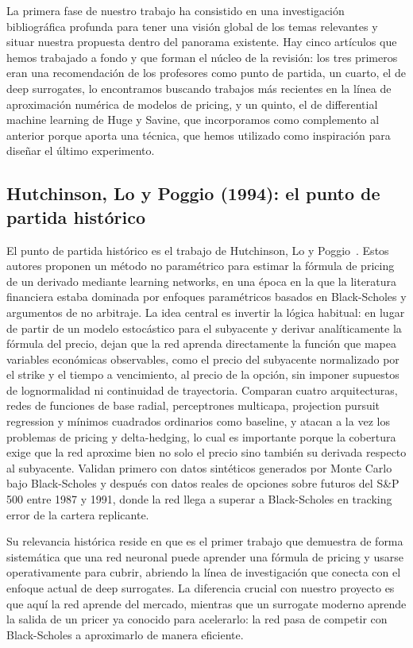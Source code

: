 \documentclass[11pt,a4paper]{article}
\begin{document}
La primera fase de nuestro trabajo ha consistido en una investigación bibliográfica profunda para tener una visión global de los temas relevantes y situar nuestra propuesta dentro del panorama existente. Hay cinco artículos que hemos trabajado a fondo y que forman el núcleo de la revisión: los tres primeros eran una recomendación de los profesores como punto de partida, un cuarto, el de deep surrogates, lo encontramos buscando trabajos más recientes en la línea de aproximación numérica de modelos de pricing, y un quinto, el de differential machine learning de Huge y Savine, que incorporamos como complemento al anterior porque aporta una técnica, que hemos utilizado como inspiración para diseñar el último experimento.

\subsection{Hutchinson, Lo y Poggio (1994): el punto de partida histórico}

El punto de partida histórico es el trabajo de Hutchinson, Lo y Poggio~\cite{hutchinson1994}. Estos autores proponen un método no paramétrico para estimar la fórmula de pricing de un derivado mediante learning networks, en una época en la que la literatura financiera estaba dominada por enfoques paramétricos basados en Black-Scholes y argumentos de no arbitraje. La idea central es invertir la lógica habitual: en lugar de partir de un modelo estocástico para el subyacente y derivar analíticamente la fórmula del precio, dejan que la red aprenda directamente la función que mapea variables económicas observables, como el precio del subyacente normalizado por el strike y el tiempo a vencimiento, al precio de la opción, sin imponer supuestos de lognormalidad ni continuidad de trayectoria. Comparan cuatro arquitecturas, redes de funciones de base radial, perceptrones multicapa, projection pursuit regression y mínimos cuadrados ordinarios como baseline, y atacan a la vez los problemas de pricing y delta-hedging, lo cual es importante porque la cobertura exige que la red aproxime bien no solo el precio sino también su derivada respecto al subyacente. Validan primero con datos sintéticos generados por Monte Carlo bajo Black-Scholes y después con datos reales de opciones sobre futuros del S\&P 500 entre 1987 y 1991, donde la red llega a superar a Black-Scholes en tracking error de la cartera replicante.

Su relevancia histórica reside en que es el primer trabajo que demuestra de forma sistemática que una red neuronal puede aprender una fórmula de pricing y usarse operativamente para cubrir, abriendo la línea de investigación que conecta con el enfoque actual de deep surrogates. La diferencia crucial con nuestro proyecto es que aquí la red aprende del mercado, mientras que un surrogate moderno aprende la salida de un pricer ya conocido para acelerarlo: la red pasa de competir con Black-Scholes a aproximarlo de manera eficiente.
\end{document}
